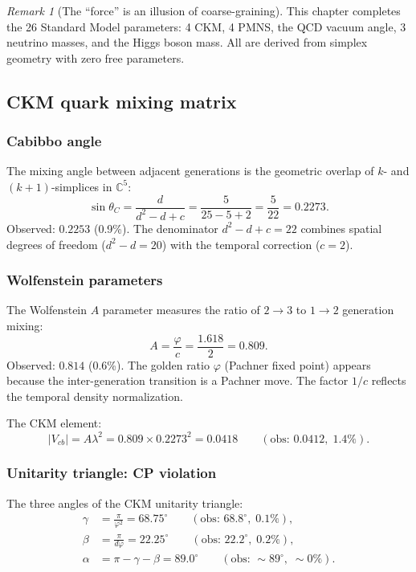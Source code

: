 \documentclass[12pt]{article}
\theoremstyle{remark}
\newtheorem{remark}[theorem]{Remark}
\theoremstyle{definition}
\newcommand{\CC}{\mathbb{C}}
\begin{document}
\begin{remark}[The ``force'' is an illusion of coarse-graining]
This chapter completes the 26 Standard Model parameters: 4 CKM, 4 PMNS, the QCD vacuum angle, 3 neutrino masses, and the Higgs boson mass. All are derived from simplex geometry with zero free parameters.

\subsection{CKM quark mixing matrix}

\subsubsection{Cabibbo angle}

The mixing angle between adjacent generations is the geometric overlap of $k$- and $(k+1)$-simplices in $\CC^5$:
\begin{equation}
\sin\theta_C = \frac{d}{d^2 - d + c} = \frac{5}{25 - 5 + 2} = \frac{5}{22} = 0.2273.
\end{equation}
Observed: $0.2253$ (0.9\%). The denominator $d^2 - d + c = 22$ combines spatial degrees of freedom ($d^2 - d = 20$) with the temporal correction ($c = 2$).

\subsubsection{Wolfenstein parameters}

The Wolfenstein $A$ parameter measures the ratio of $2 \to 3$ to $1 \to 2$ generation mixing:
\begin{equation}
A = \frac{\varphi}{c} = \frac{1.618}{2} = 0.809.
\end{equation}
Observed: $0.814$ (0.6\%). The golden ratio $\varphi$ (Pachner fixed point) appears because the inter-generation transition is a Pachner move. The factor $1/c$ reflects the temporal density normalization.

The CKM element:
\begin{equation}
|V_{cb}| = A\lambda^2 = 0.809 \times 0.2273^2 = 0.0418 \qquad (\text{obs: } 0.0412,\; 1.4\%).
\end{equation}

\subsubsection{Unitarity triangle: CP violation}

The three angles of the CKM unitarity triangle:
\begin{align}
\gamma &= \frac{\pi}{\varphi^2} = 68.75^\circ \qquad (\text{obs: } 68.8^\circ,\; 0.1\%), \label{eq:gamma} \\
\beta &= \frac{\pi}{d\varphi} = 22.25^\circ \qquad (\text{obs: } 22.2^\circ,\; 0.2\%), \\
\alpha &= \pi - \gamma - \beta = 89.0^\circ \qquad (\text{obs: } \sim 89^\circ,\; \sim 0\%).
\end{align}


\end{remark}
\end{document}
